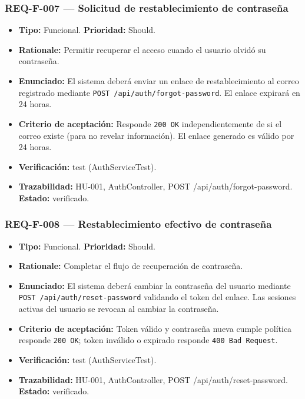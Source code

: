 \documentclass[12pt,a4paper]{article}
\begin{document}
\subsubsection{REQ-F-007 --- Solicitud de restablecimiento de contraseña}
\begin{itemize}
  \item \textbf{Tipo:} Funcional. \textbf{Prioridad:} Should.
  \item \textbf{Rationale:} Permitir recuperar el acceso cuando el usuario olvidó su contraseña.
  \item \textbf{Enunciado:} El sistema deberá enviar un enlace de restablecimiento al correo registrado mediante \texttt{POST /api/auth/forgot-password}. El enlace expirará en 24 horas.
  \item \textbf{Criterio de aceptación:} Responde \texttt{200 OK} independientemente de si el correo existe (para no revelar información). El enlace generado es válido por 24 horas.
  \item \textbf{Verificación:} test (AuthServiceTest).
  \item \textbf{Trazabilidad:} HU-001, AuthController, POST /api/auth/forgot-password. \textbf{Estado:} verificado.
\end{itemize}

\subsubsection{REQ-F-008 --- Restablecimiento efectivo de contraseña}
\begin{itemize}
  \item \textbf{Tipo:} Funcional. \textbf{Prioridad:} Should.
  \item \textbf{Rationale:} Completar el flujo de recuperación de contraseña.
  \item \textbf{Enunciado:} El sistema deberá cambiar la contraseña del usuario mediante \texttt{POST /api/auth/reset-password} validando el token del enlace. Las sesiones activas del usuario se revocan al cambiar la contraseña.
  \item \textbf{Criterio de aceptación:} Token válido y contraseña nueva cumple política responde \texttt{200 OK}; token inválido o expirado responde \texttt{400 Bad Request}.
  \item \textbf{Verificación:} test (AuthServiceTest).
  \item \textbf{Trazabilidad:} HU-001, AuthController, POST /api/auth/reset-password. \textbf{Estado:} verificado.
\end{itemize}
\end{document}
